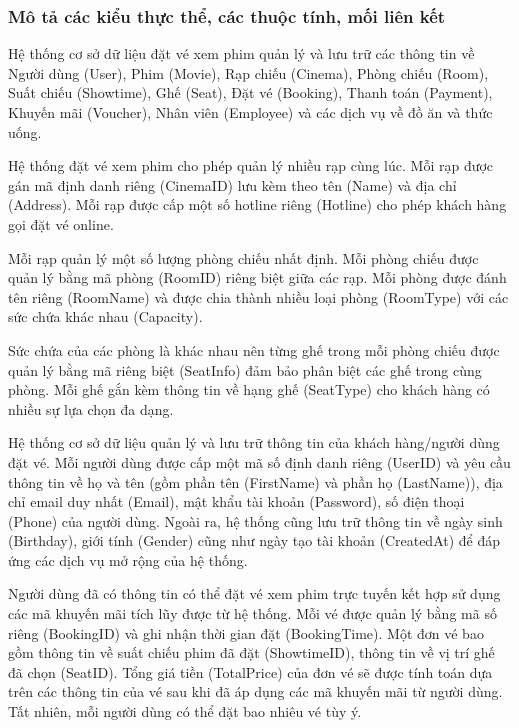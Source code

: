 \documentclass[a4paper]{article}
\newcommand{\cach}{\hspace*{1.5em}\ignorespaces}
\begin{document}
\subsubsection{Mô tả các kiểu thực thể, các thuộc tính, mối liên kết}
\cach Hệ thống cơ sở dữ liệu đặt vé xem phim quản lý và lưu trữ các thông tin về Người dùng (User), Phim (Movie), Rạp chiếu (Cinema), Phòng chiếu (Room), Suất chiếu (Showtime), Ghế (Seat), Đặt vé (Booking), Thanh toán (Payment), Khuyến mãi (Voucher), Nhân viên (Employee) và các dịch vụ về đồ ăn và thức uống.

Hệ thống đặt vé xem phim cho phép quản lý nhiều rạp cùng lúc. 
Mỗi rạp được gán mã định danh riêng (CinemaID) lưu kèm theo tên (Name) và địa chỉ (Address). 
Mỗi rạp được cấp một số hotline riêng (Hotline) cho phép khách hàng gọi đặt vé online. 

Mỗi rạp quản lý một số lượng phòng chiếu nhất định. 
Mỗi phòng chiếu được quản lý bằng mã phòng (RoomID) riêng biệt giữa các rạp. 
Mỗi phòng được đánh tên riêng (RoomName) và được chia thành nhiều loại phòng (RoomType) với các sức chứa khác nhau (Capacity).

Sức chứa của các phòng là khác nhau nên từng ghế trong mỗi phòng chiếu được quản lý bằng mã riêng biệt (SeatInfo) đảm bảo phân biệt các ghế trong cùng phòng. 
Mỗi ghế gắn kèm thông tin về hạng ghế (SeatType) cho khách hàng có nhiều sự lựa chọn đa dạng.

Hệ thống cơ sở dữ liệu quản lý và lưu trữ thông tin của khách hàng/người dùng đặt vé. 
Mỗi người dùng được cấp một mã số định danh riêng (UserID) và yêu cầu thông tin về họ và tên (gồm phần tên (FirstName) và phần họ (LastName)), địa chỉ email duy nhất (Email), mật khẩu tài khoản (Password), số điện thoại (Phone) của người dùng. 
Ngoài ra, hệ thống cũng lưu trữ thông tin về ngày sinh (Birthday), giới tính (Gender) cũng như ngày tạo tài khoản (CreatedAt) để đáp ứng các dịch vụ mở rộng của hệ thống.


Người dùng đã có thông tin có thể đặt vé xem phim trực tuyến kết hợp sử dụng các mã khuyến mãi tích lũy được từ hệ thống.
Mỗi vé được quản lý bằng mã số riêng (BookingID) và ghi nhận thời gian đặt (BookingTime). Một đơn vé bao gồm thông tin về suất chiếu phim đã đặt (ShowtimeID), thông tin về vị trí ghế đã chọn (SeatID). 
Tổng giá tiền (TotalPrice) của đơn vé sẽ được tính toán dựa trên các thông tin của vé sau khi đã áp dụng các mã khuyến mãi từ người dùng. 
Tất nhiên, mỗi người dùng có thể đặt bao nhiêu vé tùy ý.
\end{document}
